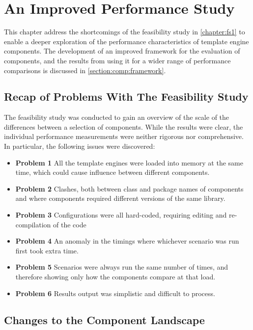 \chapter{An Improved Performance Study}
\label{chapter:fs2}

This chapter address the shortcomings of the feasibility study in \autoref{chapter:fs1} to enable a deeper exploration of the performance characteristics of template engine components.  The development of an improved framework for the evaluation of components, and the results from using it for a wider range of performance comparisons is discussed in \autoref{section:comp:framework}.

\section{Recap of Problems With The Feasibility Study}
\label{section:comp:recap}

The feasibility study was conducted to gain an overview of the scale of the differences between a selection of components. While the results were clear, the individual performance measurements were neither rigorous nor comprehensive. In particular, the following issues were discovered:

\begin{itemize}
    \item \textbf{Problem 1} All the template engines were loaded into memory at the same time, which could cause influence between different components.
    \item \textbf{Problem 2} Clashes, both between class and package names of components and where components required different versions of the same library.
    \item \textbf{Problem 3} Configurations were all hard-coded, requiring editing and re-compilation of the code   \item \textbf{Problem 4} An anomaly in the timings where whichever scenario was run first took extra time.
    \item \textbf{Problem 5} Scenarios were always run the same number of times, and therefore showing only how the components compare at that load.
    \item \textbf{Problem 6} Results output was simplistic and difficult to process.
\end{itemize}

\section{Changes to the Component Landscape}

